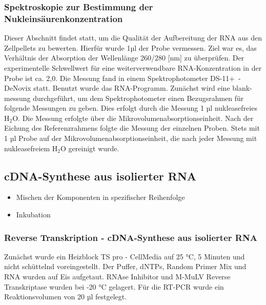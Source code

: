 \documentclass{article}
\begin{document}
\subsubsection*{Spektroskopie zur Bestimmung der Nukleinsäurenkonzentration}

Dieser Abschnitt findet statt, um die Qualität der
Aufbereitung der RNA aus den Zellpellets zu bewerten.
Hierfür wurde 1µl der Probe vermessen. Ziel war es,
das Verhältnis der Absorption der Wellenlänge 260/280 [nm] zu überprüfen.
Der experimentelle Schwellwert für eine weiterverwendbare RNA-Konzentration
in der Probe ist ca. 2,0. Die Messung fand in einem Spektrophotometer
\mbox{DS-11+ -DeNovix} statt. Benutzt wurde das RNA-Programm.
Zunächst wird eine blank-messung durchgeführt,
um dem Spektrophotometer einen Bezugsrahmen für folgende Messungen zu geben.
Dies erfolgt durch die Messung 1 µl nukleasefreies H$_2$O. Die Messung
erfolgte über die Mikrovolumenabsorptionseinheit. Nach der Eichung des
Referenzrahmens folgte die Messung der einzelnen Proben. Stets mit 1 µl
Probe auf der Mikrovolumenabsorptionseinheit, die nach jeder Messung mit
nukleasefreiem H$_2$O gereinigt wurde.
    

\subsection{cDNA-Synthese aus isolierter RNA}

\begin{itemize}
    \item Mischen der Komponenten in spezifischer Reihenfolge
    \item Inkubation
\end{itemize}

\subsubsection*{Reverse Transkription - cDNA-Synthese aus isolierter RNA}

Zunächst wurde ein Heizblock TS pro - CellMedia auf 25 °C,
5 Minuten und nicht schüttelnd voreingestellt. Der Puffer,
dNTPs, Random Primer Mix und RNA wurden auf Eis aufgetaut.
RNAse Inhibitor und M-MuLV Reverse Transkriptase wurden bei -20 °C gelagert.
Für die RT-PCR wurde ein Reaktionsvolumen von 20 µl festgelegt.
\end{document}
